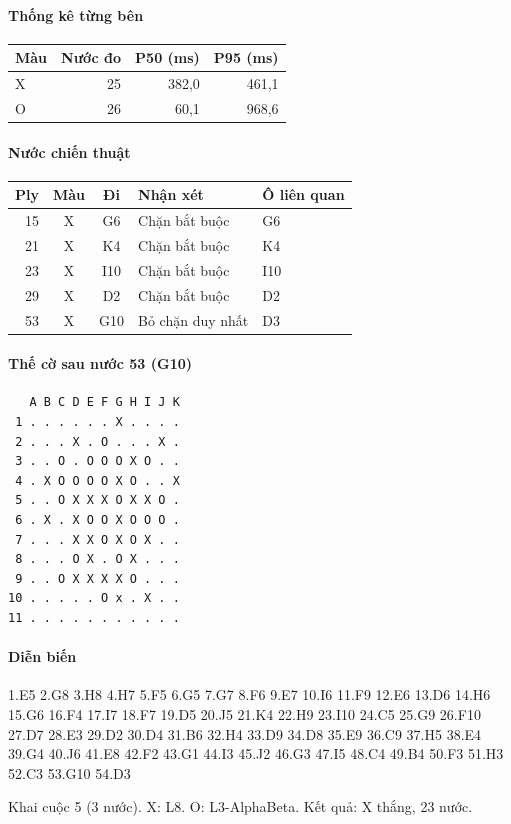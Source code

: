 \paragraph{Thống kê từng bên}
\begin{center}\small
\begin{tabular}{@{}lrrr@{}}
\toprule
Màu & Nước đo & P50 (ms) & P95 (ms) \\
\midrule
X & 25 & 382,0 & 461,1 \\
O & 26 & 60,1 & 968,6 \\
\bottomrule
\end{tabular}
\end{center}
\paragraph{Nước chiến thuật}
\begin{center}\small
\begin{tabular}{@{}rccll@{}}
\toprule
Ply & Màu & Đi & Nhận xét & Ô liên quan \\
\midrule
15 & X & G6 & Chặn bắt buộc & G6 \\
21 & X & K4 & Chặn bắt buộc & K4 \\
23 & X & I10 & Chặn bắt buộc & I10 \\
29 & X & D2 & Chặn bắt buộc & D2 \\
53 & X & G10 & Bỏ chặn duy nhất & D3 \\
\bottomrule
\end{tabular}
\end{center}
\paragraph{Thế cờ sau nước 53 (G10)}
\begin{verbatim}
   A B C D E F G H I J K
 1 . . . . . . X . . . .
 2 . . . X . O . . . X .
 3 . . O . O O O X O . .
 4 . X O O O O X O . . X
 5 . . O X X X O X X O .
 6 . X . X O O X O O O .
 7 . . . X X O X O X . .
 8 . . . O X . O X . . .
 9 . . O X X X X O . . .
10 . . . . . O x . X . .
11 . . . . . . . . . . .
\end{verbatim}
\paragraph{Diễn biến}
{\footnotesize 1.E5 2.G8 3.H8 4.H7 5.F5 6.G5 7.G7 8.F6 9.E7 10.I6 11.F9 12.E6 13.D6 14.H6 15.G6 16.F4 17.I7 18.F7 19.D5 20.J5 21.K4 22.H9 23.I10 24.C5 25.G9 26.F10 27.D7 28.E3 29.D2 30.D4 31.B6 32.H4 33.D9 34.D8 35.E9 36.C9 37.H5 38.E4 39.G4 40.J6 41.E8 42.F2 43.G1 44.I3 45.J2 46.G3 47.I5 48.C4 49.B4 50.F3 51.H3 52.C3 53.G10 54.D3\par}
Khai cuộc 5 (3 nước). X: L8. O: L3-AlphaBeta. Kết quả: X thắng, 23 nước.

